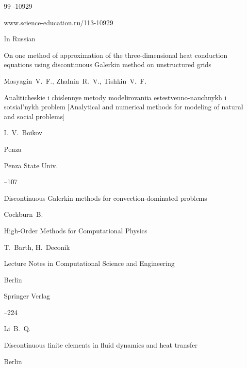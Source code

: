 \begin{thebibliography}{99}
-10929

\elink \url{www.science-education.ru/113-10929}






\lang In Russian

\paper On one method of approximation of the three-dimensional heat conduction equations using discontinuous Galerkin method on unstructured grids

\by Masyagin~V.~F., Zhalnin~R.~V., Tishkin~V.~F.

\inbook Analiticheskie i chislennye metody modelirovaniia estestvenno-nauchnykh i sotsial'nykh problem  \rm [Analytical and numerical methods for modeling of natural and social problems]

\ed I.~V.~Boikov

\publaddr Penza 

\publ Penza State Univ.


--107











\paper Discontinuous Galerkin methods for convection-dominated problems

\by Cockburn~B.

\inbook High-Order Methods for Computational Physics

\eds T.~Barth, H.~Deconik

\serial Lecture Notes in Computational Science and Engineering


\publaddr Berlin

\publ Springer Verlag 


--224







\by Li~B.~Q.

\book Discontinuous finite elements in fluid dynamics and heat transfer

\publaddr Berlin


\end{thebibliography}
